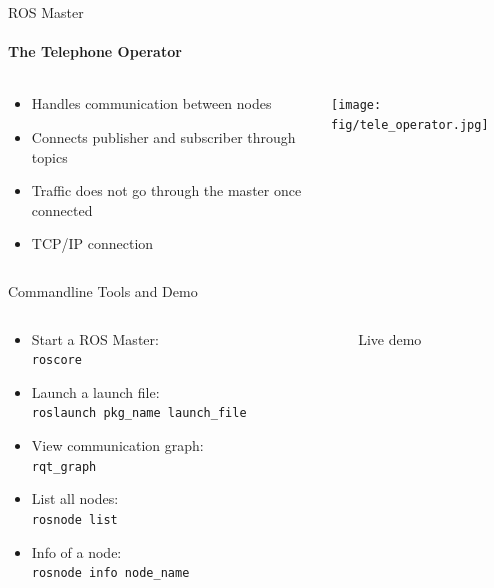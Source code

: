 \documentclass[aspectratio=43]{beamer}
\newcommand{\inline}[1]{\texttt{#1}}
\begin{document}
\begin{frame}{ROS Master}
	\framesubtitle{The Telephone Operator}
	\begin{columns}[T]
		\begin{column}{0.6\textwidth}
			\begin{itemize}
			\item<1-> Handles communication between nodes
			\item<2-> Connects publisher and subscriber through topics
			\item<3-> Traffic does \alert{not} go through the master once connected
			\item<4-> TCP/IP connection
			\end{itemize}
		\end{column}
		\begin{column}{0.4\textwidth}
			\centering
			\texttt{[image: fig/tele\_operator.jpg]}
		\end{column}
	\end{columns}
\end{frame}

\begin{frame}{Commandline Tools and Demo}
	\begin{columns}
		\begin{column}{0.5\textwidth}
			\begin{itemize}
				\item Start a ROS Master:\\\inline{roscore}
				\item Launch a launch file:\\\inline{roslaunch pkg_name launch_file}
				\item View communication graph:\\\inline{rqt_graph}
				\item List all nodes:\\\inline{rosnode list}
				\item Info of a node:\\\inline{rosnode info node_name}
			\end{itemize}
		\end{column}
		\begin{column}{0.5\textwidth}
			\centering
			Live demo
		\end{column}
	\end{columns}
\end{frame}
\end{document}

